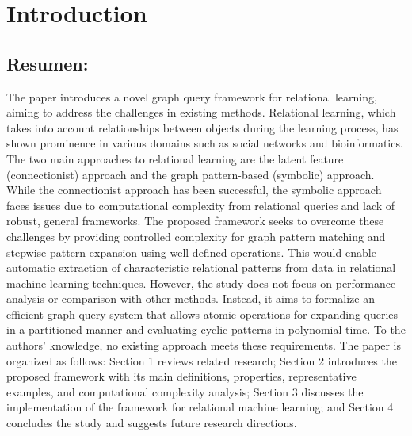 \documentclass{article}%
\begin{document}
%
\normalsize%
\clearpage%
\section{Introduction}%
\label{sec:Introduction}%
\subsection{Resumen:}%
\label{subsec:Resumen}%
The paper introduces a novel graph query framework for relational learning, aiming to address the challenges in existing methods. Relational learning, which takes into account relationships between objects during the learning process, has shown prominence in various domains such as social networks and bioinformatics. The two main approaches to relational learning are the latent feature (connectionist) approach and the graph pattern{-}based (symbolic) approach. While the connectionist approach has been successful, the symbolic approach faces issues due to computational complexity from relational queries and lack of robust, general frameworks.\newline%
\newline%
The proposed framework seeks to overcome these challenges by providing controlled complexity for graph pattern matching and stepwise pattern expansion using well{-}defined operations. This would enable automatic extraction of characteristic relational patterns from data in relational machine learning techniques.\newline%
\newline%
However, the study does not focus on performance analysis or comparison with other methods. Instead, it aims to formalize an efficient graph query system that allows atomic operations for expanding queries in a partitioned manner and evaluating cyclic patterns in polynomial time. To the authors' knowledge, no existing approach meets these requirements.\newline%
\newline%
The paper is organized as follows: Section 1 reviews related research; Section 2 introduces the proposed framework with its main definitions, properties, representative examples, and computational complexity analysis; Section 3 discusses the implementation of the framework for relational machine learning; and Section 4 concludes the study and suggests future research directions.

%
\end{document}
